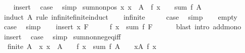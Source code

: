 \begin{isabellebody}
\ \ \isamarkupfalse%
\ insert\ \isamarkupfalse%
\ {\isacharquery}{\kern0pt}case\ \isamarkupfalse%
\ simp\isanewline
{}\isamarkupfalse%
%
\endisatagproof
{\isafoldproof}%
%
\isadelimproof
\isanewline
%
\endisadelimproof
\isanewline
{}\isamarkupfalse%
\ sum{\isacharunderscore}{\kern0pt}nonpos{\isacharcolon}{\kern0pt}\ {\isachardoublequoteopen}{\isacharparenleft}{\kern0pt}{\isasymAnd}x{\isachardot}{\kern0pt}\ x\ {\isasymin}\ A\ {\isasymLongrightarrow}\ f\ x\ {\isasymle}\ {}{\isacharparenright}{\kern0pt}\ {\isasymLongrightarrow}\ sum\ f\ A\ {\isasymle}\ {}{\isachardoublequoteclose}\isanewline
%
\isadelimproof
%
\endisadelimproof
%
\isatagproof
{}\isamarkupfalse%
\ {\isacharparenleft}{\kern0pt}induct\ A\ rule{\isacharcolon}{\kern0pt}\ infinite{\isacharunderscore}{\kern0pt}finite{\isacharunderscore}{\kern0pt}induct{\isacharparenright}{\kern0pt}\isanewline
\ \ \isamarkupfalse%
\ infinite\isanewline
\ \ \isamarkupfalse%
\ \isamarkupfalse%
\ {\isacharquery}{\kern0pt}case\ \isamarkupfalse%
\ simp\isanewline
{}\isamarkupfalse%
\isanewline
\ \ \isamarkupfalse%
\ empty\isanewline
\ \ \isamarkupfalse%
\ \isamarkupfalse%
\ {\isacharquery}{\kern0pt}case\ \isamarkupfalse%
\ simp\isanewline
{}\isamarkupfalse%
\isanewline
\ \ \isamarkupfalse%
\ {\isacharparenleft}{\kern0pt}insert\ x\ F{\isacharparenright}{\kern0pt}\isanewline
\ \ \isamarkupfalse%
\ \isamarkupfalse%
\ {\isachardoublequoteopen}f\ x\ {\isacharplus}{\kern0pt}\ sum\ f\ F\ {\isasymle}\ {}\ {\isacharplus}{\kern0pt}\ {}{\isachardoublequoteclose}\ \isamarkupfalse%
\ {\isacharparenleft}{\kern0pt}blast\ intro{\isacharcolon}{\kern0pt}\ add{\isacharunderscore}{\kern0pt}mono{\isacharparenright}{\kern0pt}\isanewline
\ \ \isamarkupfalse%
\ insert\ \isamarkupfalse%
\ {\isacharquery}{\kern0pt}case\ \isamarkupfalse%
\ simp\isanewline
{}\isamarkupfalse%
%
\endisatagproof
{\isafoldproof}%
%
\isadelimproof
\isanewline
%
\endisadelimproof
\isanewline
{}\isamarkupfalse%
\ sum{\isacharunderscore}{\kern0pt}nonneg{\isacharunderscore}{\kern0pt}eq{\isacharunderscore}{\kern0pt}{}{\isacharunderscore}{\kern0pt}iff{\isacharcolon}{\kern0pt}\isanewline
\ \ {\isachardoublequoteopen}finite\ A\ {\isasymLongrightarrow}\ {\isacharparenleft}{\kern0pt}{\isasymAnd}x{\isachardot}{\kern0pt}\ x\ {\isasymin}\ A\ {\isasymLongrightarrow}\ {}\ {\isasymle}\ f\ x{\isacharparenright}{\kern0pt}\ {\isasymLongrightarrow}\ sum\ f\ A\ {\isacharequal}{\kern0pt}\ {}\ {\isasymlongleftrightarrow}\ {\isacharparenleft}{\kern0pt}{\isasymforall}x{\isasymin}A{\isachardot}{\kern0pt}\ f\ x\ {\isacharequal}{\kern0pt}\ {}{\isacharparenright}{\kern0pt}{\isachardoublequoteclose}\isanewline

\end{isabellebody}
